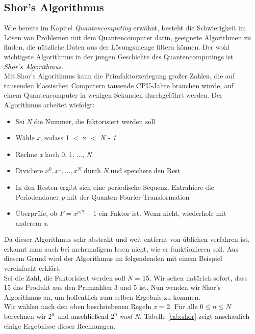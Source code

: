\documentclass[12pt]{IEEEtran}
\begin{document}
\subsection{Shor's Algorithmus}

Wie bereits im Kapitel \textit{Quantencomputing} erwähnt, besteht die Schwierigkeit im Lösen von Problemen mit dem Quantencomputer darin, geeignete Algorithmen zu finden, die nützliche Daten aus der Lösungsmenge filtern können. Der wohl wichtigste Algorithmus in der jungen Geschichte des Quantencomputings ist \textit{Shor's Algorithmus}. \cite{shor1998quantum} \\

Mit Shor's Algorithmus kann die Primfaktorzerlegung großer Zahlen, die auf tausenden klassischen Computern tausende CPU-Jahre brauchen würde, auf einem Quantencomputer in wenigen Sekunden durchgeführt werden. Der Algorithmus arbeitet wiefolgt: \cite{mavroeidis2018impact} \\
\begin{itemize}
    \item Sei \textit{N} die Nummer, die faktorisiert werden soll
    \item Wähle \textit{x}, sodass 1 $<$ x $<$ \textit{N - 1}
    \item Rechne \textit{x} hoch 0, 1, ..., \textit{N}
    \item Dividiere $x^0, x^1, ..., x^N$ durch \textit{N} und speichere den Rest 
    \item In den Resten ergibt sich eine periodische Sequenz. Extrahiere die Periodendauer \textit{p} mit der Quanten-Fourier-Transformation
    \item Überprüfe, ob $F = x^{p/2} - 1$ ein Faktor ist. Wenn nicht, wiederhole mit anderem \textit{x}.
\end{itemize}

Da dieser Algorithmus sehr abstrakt und weit entfernt von üblichen verfahren ist, erkannt man auch bei mehrmaligem lesen nicht, wie er funktionieren soll. Aus diesem Grund wird der Algorithmus im folgendenden mit einem Beispiel vereinfacht erklärt: \\

Sei die Zahl, die Faktorisiert werden soll \textit{N} = 15. Wir sehen natürich sofort, dass 15 das Produkt aus den Primzahlen 3 und 5 ist. Nun wenden wir Shor's Algorithmus an, um hoffentlich zum selben Ergebnis zu kommen. \\

Wir wählen nach den oben beschriebenen Regeln \textit{x} = 2. Für alle $0 \leq n \leq N$ berechnen wir $2^n$ und anschließend $2^n$ \textit{mod N}. Tabelle \ref{tab:shor} zeigt anschaulich einige Ergebnisse dieser Rechnungen. \\
\end{document}
